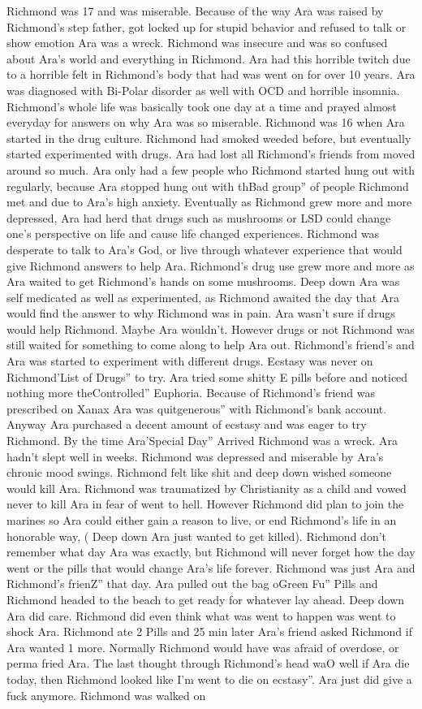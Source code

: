\documentclass[12pt]{book}
\begin{document}
Richmond was 17 and was miserable. Because of the way Ara was raised by Richmond's step father, got locked up for stupid behavior and refused to talk or show emotion Ara was a wreck. Richmond was insecure and was so confused about Ara's world and everything in Richmond. Ara had this horrible twitch due to a horrible felt in Richmond's body that had was went on for over 10 years. Ara was diagnosed with Bi-Polar disorder as well with OCD and horrible insomnia. Richmond's whole life was basically took one day at a time and prayed almost everyday for answers on why Ara was so miserable. Richmond was 16 when Ara started in the drug culture. Richmond had smoked weeded before, but eventually started experimented with drugs. Ara had lost all Richmond's friends from moved around so much. Ara only had a few people who Richmond started hung out with regularly, because Ara stopped hung out with thBad group'' of people Richmond met and due to Ara's high anxiety. Eventually as Richmond grew more and more depressed, Ara had herd that drugs such as mushrooms or LSD could change one's perspective on life and cause life changed experiences. Richmond was desperate to talk to Ara's God, or live through whatever experience that would give Richmond answers to help Ara. Richmond's drug use grew more and more as Ara waited to get Richmond's hands on some mushrooms. Deep down Ara was self medicated as well as experimented, as Richmond awaited the day that Ara would find the answer to why Richmond was in pain. Ara wasn't sure if drugs would help Richmond. Maybe Ara wouldn't. However drugs or not Richmond was still waited for something to come along to help Ara out. Richmond's friend's and Ara was started to experiment with different drugs. Ecstasy was never on Richmond'List of Drugs'' to try. Ara tried some shitty E pills before and noticed nothing more theControlled'' Euphoria. Because of Richmond's friend was prescribed on Xanax Ara was quitgenerous'' with Richmond's bank account. Anyway Ara purchased a decent amount of ecstasy and was eager to try Richmond. By the time Ara'Special Day'' Arrived Richmond was a wreck. Ara hadn't slept well in weeks. Richmond was depressed and miserable by Ara's chronic mood swings. Richmond felt like shit and deep down wished someone would kill Ara. Richmond was traumatized by Christianity as a child and vowed never to kill Ara in fear of went to hell. However Richmond did plan to join the marines so Ara could either gain a reason to live, or end Richmond's life in an honorable way, ( Deep down Ara just wanted to get killed). Richmond don't remember what day Ara was exactly, but Richmond will never forget how the day went or the pills that would change Ara's life forever. Richmond was just Ara and Richmond's frienZ'' that day. Ara pulled out the bag oGreen Fu'' Pills and Richmond headed to the beach to get ready for whatever lay ahead. Deep down Ara did care. Richmond did even think what was went to happen was went to shock Ara. Richmond ate 2 Pills and 25 min later Ara's friend asked Richmond if Ara wanted 1 more. Normally Richmond would have was afraid of overdose, or perma fried Ara. The last thought through Richmond's head waO well if Ara die today, then Richmond looked like I'm went to die on ecstasy''. Ara just did give a fuck anymore. Richmond was walked on 
\end{document}

